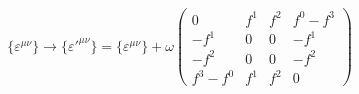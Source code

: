 \begin{equation}
\{\varepsilon^{\mu \nu} \} \rightarrow \{\varepsilon'^{\mu \nu} \} = \{\varepsilon^{\mu \nu}\}  + \omega \left( \begin{array}{cccc}
0 & f^1 & f^2 & f^0 - f^3 \\
-f^1 & 0& 0 &  -f^1\\
-f^2 & 0 & 0 &  - f^2 \\
 f^3  -  f^0 & f^1 &  f^2 & 0
\end{array} \right)
\label{200}
\end{equation}

